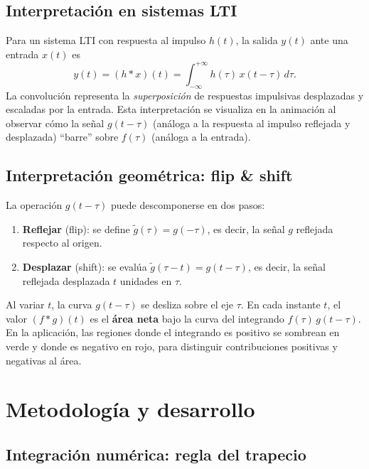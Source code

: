 \documentclass[12pt,a4paper]{article}
\begin{document}
\subsection{Interpretación en sistemas LTI}

Para un sistema LTI con respuesta al impulso \(h(t)\), la salida \(y(t)\) ante una entrada \(x(t)\) es
\begin{equation}
  y(t) = (h * x)(t) = \int_{-\infty}^{+\infty} h(\tau)\, x(t - \tau)\, d\tau.
\end{equation}
La convolución representa la \emph{superposición} de respuestas impulsivas desplazadas y escaladas por la entrada. Esta interpretación se visualiza en la animación al observar cómo la señal \(g(t-\tau)\) (análoga a la respuesta al impulso reflejada y desplazada) ``barre'' sobre \(f(\tau)\) (análoga a la entrada).

\subsection{Interpretación geométrica: flip \& shift}

La operación \(g(t - \tau)\) puede descomponerse en dos pasos:
\begin{enumerate}
  \item \textbf{Reflejar} (flip): se define \(\tilde{g}(\tau) = g(-\tau)\), es decir, la señal \(g\) reflejada respecto al origen.
  \item \textbf{Desplazar} (shift): se evalúa \(\tilde{g}(\tau - t) = g(t - \tau)\), es decir, la señal reflejada desplazada \(t\) unidades en \(\tau\).
\end{enumerate}
Al variar \(t\), la curva \(g(t-\tau)\) se desliza sobre el eje \(\tau\). En cada instante \(t\), el valor \((f*g)(t)\) es el \textbf{área neta} bajo la curva del integrando \(f(\tau)\,g(t-\tau)\). En la aplicación, las regiones donde el integrando es positivo se sombrean en verde y donde es negativo en rojo, para distinguir contribuciones positivas y negativas al área.

\section{Metodología y desarrollo}

\subsection{Integración numérica: regla del trapecio}
\end{document}
